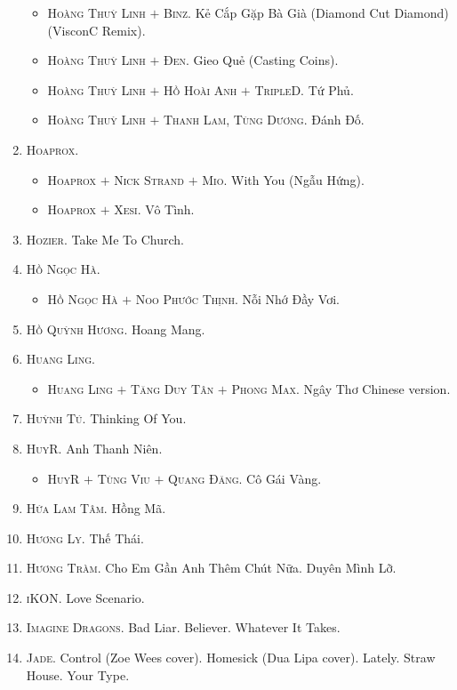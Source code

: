\documentclass[oneside]{book}
\numberwithin{equation}{section}
\begin{document}
\begin{enumerate}
\begin{itemize}
		\item \textsc{Hoàng Thuỳ Linh $+$ Binz.} Kẻ Cắp Gặp Bà Già (Diamond Cut Diamond) (VisconC Remix). 
		\item \textsc{Hoàng Thuỳ Linh $+$ Đen.} Gieo Quẻ (Casting Coins).
		\item \textsc{Hoàng Thuỳ Linh $+$ Hồ Hoài Anh $+$ TripleD.} Tứ Phủ.
		\item \textsc{Hoàng Thuỳ Linh $+$ Thanh Lam, Tùng Dương.} Đánh Đố.
	\end{itemize}
	\item \textsc{Hoaprox.}
	\begin{itemize}
		\item \textsc{Hoaprox $+$ Nick Strand $+$ Mio.} With You (Ngẫu Hứng).
		\item \textsc{Hoaprox $+$ Xesi.} Vô Tình.
	\end{itemize}
	\item \textsc{Hozier.} Take Me To Church.
	\item \textsc{Hồ Ngọc Hà.}
	\begin{itemize}
		\item \textsc{Hồ Ngọc Hà $+$ Noo Phước Thịnh.} Nỗi Nhớ Đầy Vơi.
	\end{itemize}
	\item \textsc{Hồ Quỳnh Hương.} Hoang Mang.
	\item \textsc{Huang Ling.}
	\begin{itemize}
		\item \textsc{Huang Ling $+$ Tăng Duy Tân $+$ Phong Max.} Ngây Thơ Chinese version.
	\end{itemize}
	\item \textsc{Huỳnh Tú.} Thinking Of You.
	\item \textsc{HuyR.} Anh Thanh Niên.
	\begin{itemize}
		\item \textsc{HuyR $+$ Tùng Viu $+$ Quang Đăng.} Cô Gái Vàng.
	\end{itemize}
	\item \textsc{Hứa Lam Tâm.} Hồng Mã.
	\item \textsc{Hương Ly.} Thế Thái.
	\item \textsc{Hương Tràm.} Cho Em Gần Anh Thêm Chút Nữa. Duyên Mình Lỡ.
	\item \textsc{iKON.} Love Scenario. 
	\item \textsc{Imagine Dragons.} Bad Liar. Believer. Whatever It Takes.
	\item \textsc{Jade.} Control (Zoe Wees cover). Homesick (Dua Lipa cover). Lately. Straw House. Your Type.

\end{enumerate}
\end{document}
